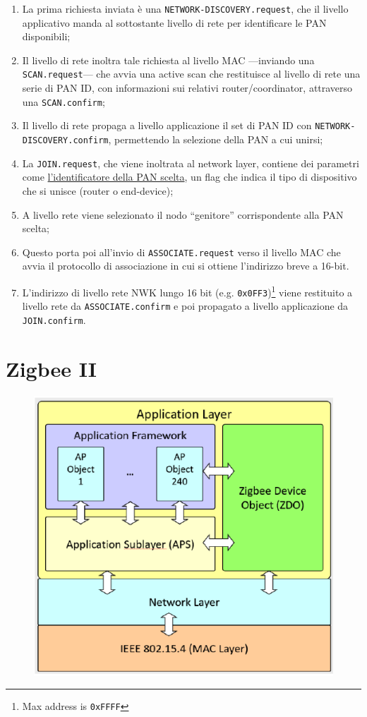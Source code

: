 \begin{enumerate}
\item La prima richiesta inviata è una \texttt{NETWORK-DISCOVERY.request}, che il livello applicativo manda al sottostante livello di rete per identificare le PAN disponibili;
\item Il livello di rete inoltra tale richiesta al livello MAC ---inviando una \texttt{SCAN.request}--- che avvia una active scan che restituisce al livello di rete una serie di PAN ID, con informazioni sui relativi router/coordinator, attraverso una \texttt{SCAN.confirm};
\item Il livello di rete propaga a livello applicazione il set di PAN ID con \texttt{NETWORK-DISCOVERY.confirm}, permettendo la selezione della PAN a cui unirsi;
\item La \texttt{JOIN.request}, che viene inoltrata al network layer, contiene dei parametri come \ul{l'identificatore della PAN scelta}, un flag che indica il tipo di dispositivo che si unisce (router o end-device);
\item A livello rete viene selezionato il nodo ``genitore'' corrispondente alla PAN scelta;
\item Questo porta poi all'invio di \texttt{ASSOCIATE.request} verso il livello MAC che avvia il protocollo di associazione in cui si ottiene l'indirizzo breve a 16-bit.
\item L'indirizzo di livello rete NWK lungo 16 bit (e.g. \texttt{0x0FF3})\footnote{Max address is \texttt{0xFFFF}} viene restituito a livello rete da \texttt{ASSOCIATE.confirm} e poi propagato a livello applicazione da \texttt{JOIN.confirm}.
\end{enumerate}

\section{Zigbee II}
\begin{figure}[htbp]
   \centering
   \includegraphics{images/questions/Schermata del 2023-10-19 15-32-10.png}
   \label{fig:dom7}
\end{figure}
   
